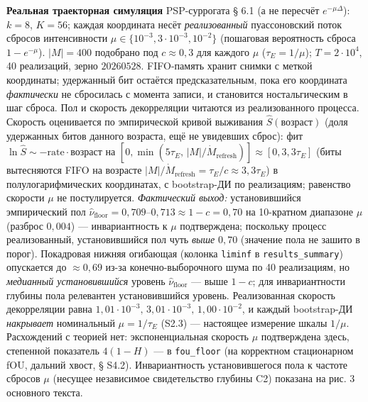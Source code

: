 \documentclass[12pt]{iopart}
\begin{document}
\textbf{Реальная траекторная симуляция} PSP-суррогата \cite{Andriishin2026b} § 6.1 (а не пересчёт \(e^{-\mu\Delta}\)): \(k = 8\), \(K = 56\); каждая координата несёт \emph{реализованный} пуассоновский поток сбросов интенсивности \(\mu \in \{10^{-3}, 3\cdot10^{-3}, 10^{-2}\}\) (пошаговая вероятность сброса \(1 - e^{-\mu}\)). \(|M| = 400\) подобрано под \(c \approx 0{,}3\) для каждого \(\mu\) (\(\tau_E = 1/\mu\)); \(T = 2\cdot10^4\), 40 реализаций, зерно \(20260528\). FIFO-память хранит снимки с меткой координаты; удержанный бит остаётся предсказательным, пока его координата \emph{фактически} не сбросилась с момента записи, и становится ностальгическим в шаг сброса. Пол и скорость декорреляции читаются из реализованного процесса. Скорость оценивается по эмпирической кривой выживания \(\hat S(\text{возраст})\) (доля удержанных битов данного возраста, ещё не увидевших сброс): фит \(\ln\hat S \sim -\text{rate}\cdot\text{возраст}\) на \([0, \min(5\tau_E,\,|M|/\dot M_{\text{refresh}})] \approx [0, 3{,}3\tau_E]\) (биты вытесняются FIFO на возрасте \(|M|/\dot M_{\text{refresh}} = \tau_E/c \approx 3{,}3\tau_E\)) в полулогарифмических координатах, с bootstrap-ДИ по реализациям; равенство скорости \(\mu\) не постулируется. \emph{Фактический выход:} установившийся эмпирический пол \(\hat\nu_{\text{floor}} = 0{,}709\text{–}0{,}713 \approx 1-c = 0{,}70\) на 10-кратном диапазоне \(\mu\) (разброс \(0{,}004\)) --- инвариантность к \(\mu\) подтверждена; поскольку процесс реализованный, установившийся пол чуть \emph{выше} \(0{,}70\) (значение пола не зашито в порог). Покадровая нижняя огибающая (колонка \texttt{liminf} в \texttt{results\_summary}) опускается до \(\approx0{,}69\) из-за конечно-выборочного шума по 40 реализациям, но \emph{медианный установившийся} уровень \(\hat\nu_{\text{floor}}\) --- выше \(1-c\); для инвариантности глубины пола релевантен установившийся уровень. Реализованная скорость декорреляции равна \(1{,}01\cdot10^{-3},\,3{,}01\cdot10^{-3},\,1{,}00\cdot10^{-2}\), и каждый bootstrap-ДИ \emph{накрывает} номинальный \(\mu = 1/\tau_E\) (S2.3) --- настоящее измерение шкалы \(1/\mu\). Расхождений с теорией нет: экспоненциальная скорость \(\mu\) подтверждена здесь, степенной показатель \(4(1-H)\) --- в \texttt{fou\_floor} (на корректном стационарном fOU, дальний хвост, § S4.2). Инвариантность установившегося пола к частоте сбросов \(\mu\) (несущее независимое свидетельство глубины C2) показана на рис. 3 основного текста.
\end{document}
